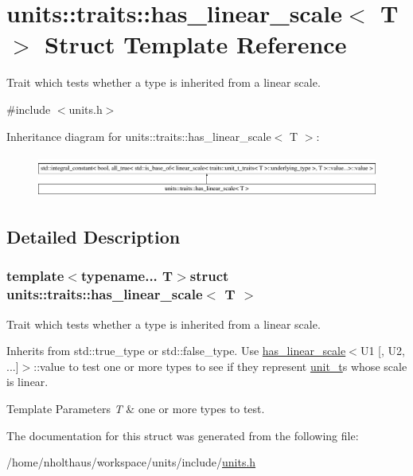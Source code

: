 \hypertarget{structunits_1_1traits_1_1has__linear__scale}{}\section{units\+:\+:traits\+:\+:has\+\_\+linear\+\_\+scale$<$ T $>$ Struct Template Reference}
\label{structunits_1_1traits_1_1has__linear__scale}


Trait which tests whether a type is inherited from a linear scale.  




{\ttfamily \#include $<$units.\+h$>$}

Inheritance diagram for units\+:\+:traits\+:\+:has\+\_\+linear\+\_\+scale$<$ T $>$\+:\begin{figure}[H]
\begin{center}
\leavevmode
\includegraphics[height=1.430396cm]{structunits_1_1traits_1_1has__linear__scale}
\end{center}
\end{figure}


\subsection{Detailed Description}
\subsubsection*{template$<$typename... T$>$struct units\+::traits\+::has\+\_\+linear\+\_\+scale$<$ T $>$}

Trait which tests whether a type is inherited from a linear scale. 

Inherits from {\ttfamily std\+::true\+\_\+type} or {\ttfamily std\+::false\+\_\+type}. Use {\ttfamily \hyperlink{structunits_1_1traits_1_1has__linear__scale}{has\+\_\+linear\+\_\+scale}$<$U1 \mbox{[}, U2, ...\mbox{]}$>$\+::value} to test one or more types to see if they represent \hyperlink{classunits_1_1unit__t}{unit\+\_\+t}\textquotesingle{}s whose scale is linear. 
\begin{DoxyTemplParams}{Template Parameters}
{\em T} & one or more types to test. \\
\hline
\end{DoxyTemplParams}


The documentation for this struct was generated from the following file\+:\begin{DoxyCompactItemize}
\item 
/home/nholthaus/workspace/units/include/\hyperlink{units_8h}{units.\+h}\end{DoxyCompactItemize}
